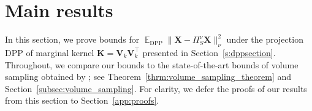 \documentclass[twoside,11pt]{book}
\newtheorem{proposition}{Proposition}
\numberwithin{theorem}{chapter}
\numberwithin{definition}{chapter}
\numberwithin{proposition}{chapter}
\numberwithin{corollary}{chapter}
\numberwithin{example}{chapter}
\numberwithin{lemma}{chapter}
\numberwithin{assumption}{chapter}
\numberwithin{equation}{chapter}
\numberwithin{figure}{chapter}
\DeclareMathOperator{\Det}{Det}
\DeclareMathOperator{\Fr}{\mathrm{Fr}}
\DeclareMathOperator{\DPP}{\mathrm{DPP}}
\DeclareMathOperator{\VS}{\mathrm{VS}}
\DeclareMathOperator{\Tran}{\intercal}
\DeclareMathOperator{\EX}{\mathbb{E}}
\DeclareMathOperator{\Prb}{\mathbb{P}}
\begin{document}


\section{Main results}
\label{sec:main_results}
In this section, we prove bounds for $\EX_{\DPP} \| \bm{X} - \Pi_{S}^{\nu}\bm{X} \|^2_{\nu}$ under the projection DPP of marginal kernel $\bm{K} = \bm{V}^{}_{k}\bm{V}^{\Tran}_{k}$ presented in Section~\ref{s:dppsection}. Throughout, we compare our bounds to the state-of-the-art bounds of volume sampling obtained by \cite{DRVW06}; see Theorem~\ref{thrm:volume_sampling_theorem} and Section~\ref{subsec:volume_sampling}. For clarity, we defer the proofs of our results from this section to Section~\ref{app:proofs}.

%

\end{document}
